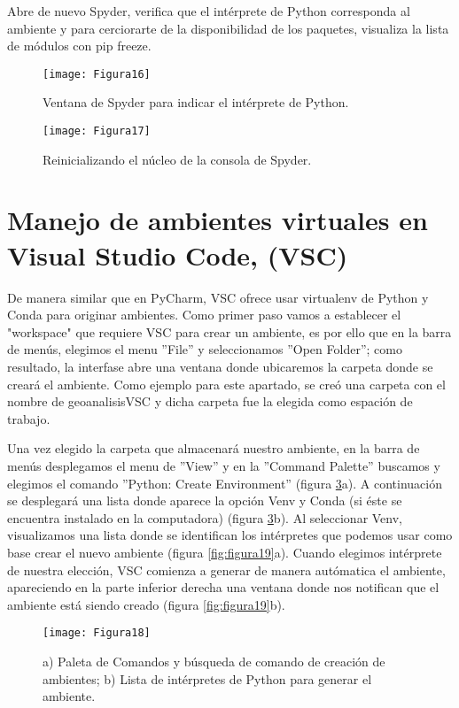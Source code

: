 Abre de nuevo Spyder, verifica que el intérprete de Python corresponda al ambiente y para cerciorarte de la disponibilidad de los paquetes, visualiza la lista de módulos con pip freeze.
	
\begin{figure}[H]
\centering
\texttt{[image: Figura16]}
\caption{Ventana de Spyder para indicar el intérprete de Python.}
\label{fig:figura16}
\end{figure}
	
\begin{figure}[H]
\centering
\texttt{[image: Figura17]}
\caption{Reinicializando el núcleo de la consola de Spyder.}
\label{fig:figura17}
\end{figure}
\section{Manejo de ambientes virtuales en Visual Studio Code, (VSC)}
De manera similar que en PyCharm, VSC ofrece usar virtualenv de Python y Conda para originar ambientes. Como primer paso vamos a establecer el "workspace" que requiere VSC para crear un ambiente, es por ello que en la barra de menús, elegimos el menu ''File'' y seleccionamos ''Open Folder''; como resultado, la interfase abre una ventana donde ubicaremos la carpeta donde se creará el ambiente. Como ejemplo para este apartado, se creó una carpeta con el nombre de geoanalisisVSC y dicha carpeta fue la elegida como espación de trabajo.\bigskip
	
Una vez elegido la carpeta que almacenará nuestro ambiente, en la barra de menús desplegamos el menu de ''View'' y  en la ''Command Palette'' buscamos y elegimos el comando ''Python: Create Environment'' (figura \ref{fig:figura18}a). A continuación se desplegará una lista donde aparece la opción Venv y Conda (si éste se encuentra instalado en la computadora) (figura \ref{fig:figura18}b). Al seleccionar Venv, visualizamos una lista donde se identifican los intérpretes que podemos usar como base crear el nuevo ambiente (figura \ref{fig:figura19}a). Cuando elegimos intérprete de nuestra elección, VSC comienza a generar de manera autómatica el ambiente, apareciendo en la parte inferior derecha una ventana donde nos notifican que el ambiente está siendo creado (figura \ref{fig:figura19}b).
	
\begin{figure}[H]
\centering
\texttt{[image: Figura18]}
\caption{a) Paleta de Comandos y búsqueda de comando de creación de ambientes; b) Lista de intérpretes de Python para generar el ambiente.}
\label{fig:figura18}
\end{figure}
	

